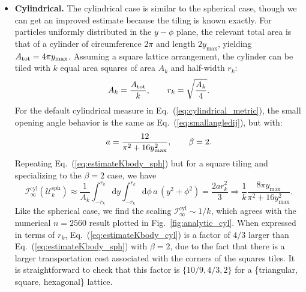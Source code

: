 \documentclass[letterpaper,11pt]{article}
\newcommand{\iso}[2]{\mathcal{I}^\text{#1}_{#2}}
\DeclareRobustCommand{\Fig}[1]{Fig.~\ref{#1}}
\DeclareRobustCommand{\Eq}[1]{Eq.~(\ref{#1})}
\begin{document}
\begin{itemize}
\item \textbf{Cylindrical.}
%
The cylindrical case is similar to the spherical case, though we can get an improved estimate because the tiling is known exactly.
%
For particles uniformly distributed in the $y-\phi$ plane, the relevant total area is that of a cylinder of circumference $2\pi$ and length $2y_\text{max}$, yielding $A_{\rm tot} = 4\pi y_\text{max}$.
%
Assuming a square lattice arrangement, the cylinder can be tiled with $k$ equal area squares of area $A_k$ and half-width $r_k$:
%
\begin{equation}
A_k = \frac{A_{\rm tot}}{k}, \qquad r_k = \sqrt{\frac{A_k}{4}}.
\end{equation}
%
For the default cylindrical measure in \Eq{eq:cylindrical_metric}, the small opening angle behavior is the same as \Eq{eq:smallangledij}, but with:
%
\begin{equation}
a = \frac{12}{\pi^2 + 16 y_{\rm max}^2}, \qquad \beta = 2.
\end{equation} 
%
Repeating \Eq{eq:estimateKbody_sph} but for a square tiling and specializing to the $\beta = 2$ case, we have
%
\begin{equation}
\iso{cyl}{\infty}(\mathcal{U}^\text{sph}_k) \approx \frac{1}{A_k} \int_{-r_k}^{r_k} \text{d} y \int_{-r_k}^{r_k} \text{d} \phi \, a \, (y^2 + \phi^2)  = \frac{2 a r_k^2}{3} \Rightarrow \frac{1}{k} \frac{8 \pi y_\text{max}}{\pi^2 + 16 y_\text{max}^2}.
\label{eq:estimateKbody_cyl}
\end{equation}
%
Like the spherical case, we find the scaling $\iso{cyl}{\infty} \sim 1/k$, which agrees with the numerical $n=2560$ result plotted in \Fig{fig:analytic_cyl}.
%
When expressed in terms of $r_k$, \Eq{eq:estimateKbody_cyl} is a factor of $4/3$ larger than \Eq{eq:estimateKbody_sph} with $\beta = 2$, due to the fact that there is a larger transportation cost associated with the corners of the squares tiles.
%
It is straightforward to check that this factor is $\{10/9, 4/3, 2\}$ for a \{triangular, square, hexagonal\} lattice.



\end{itemize}
\end{document}
